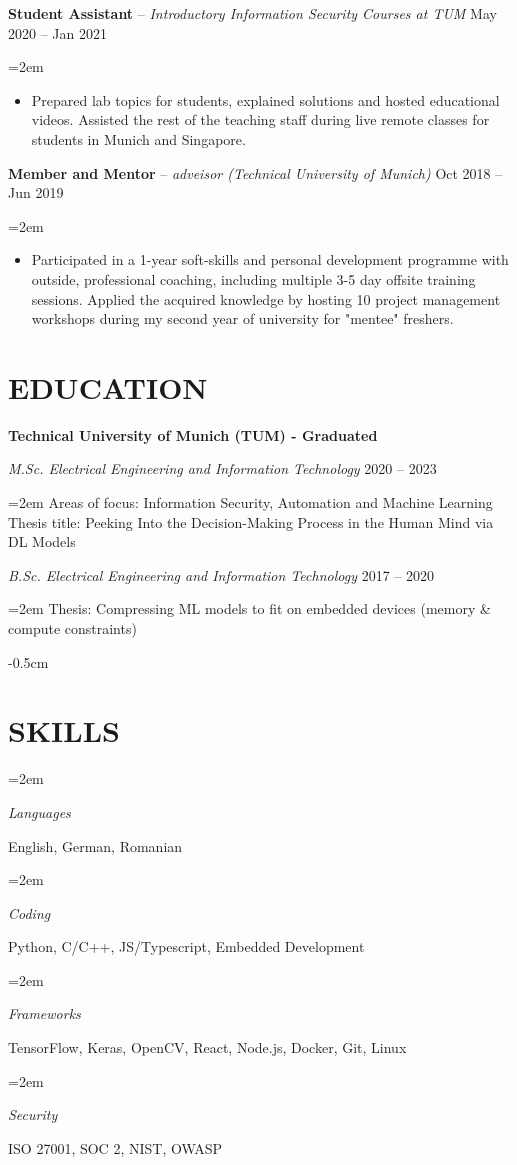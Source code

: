 \documentclass[paper=a4,fontsize=11pt]{scrartcl}
\newlength{\spacebox}
\newcommand{\sepspace}{\vspace*{0.35em}}		%
\newcommand{\NewPart}[1]{\section*{\uppercase{#1}}}
\newcommand{\PersonalEntry}[2]{
		\noindent\hangindent=2em\hangafter=0 %
		\parbox{\spacebox}{        %
		\textit{#1}}		       %
		\hspace{1.5em} #2 \par}    %
\newcommand{\SkillsEntry}[2]{      %
		\noindent\hangindent=2em\hangafter=0 %
		\parbox{\spacebox}{        %
		\textit{#1}}			   %
		\hspace{2.5em} #2 \par}    %
\newcommand{\EducationEntry}[4]{
		\noindent \textit{#1} \hfill      %
		\colorbox{custom_gray}{\color{white}#2} \par  %
		\noindent\hangindent=2em\hangafter=0 \small #3 %
		\normalsize \par}
\newcommand{\WorkEntry}[4]{				  %
		\noindent \textbf{#1} – \textit{#3} \hfill      %
		\colorbox{custom_gray}{\color{white}#2} \par  %
		\noindent\hangindent=2em\hangafter=0 \small #4 %
		\normalsize \par}
\begin{document}
\WorkEntry{Student Assistant}{May 2020 – Jan 2021}{Introductory Information Security Courses at TUM}
{
\begin{itemize}
  \item Prepared lab topics for students, explained solutions and hosted educational videos. Assisted the rest of the teaching staff during live remote classes for students in Munich and Singapore.
\end{itemize}
}

\WorkEntry{Member and Mentor}{Oct 2018 – Jun 2019}{adveisor (Technical University of Munich)}
{
\begin{itemize}
	\item Participated in a 1-year soft-skills and personal development programme with outside, professional coaching, including multiple 3-5 day offsite training sessions. Applied the acquired knowledge by hosting 10 project management workshops during my second year of university for "mentee" freshers.
\end{itemize}
}


\vspace{-0.5cm}
\NewPart{Education}{}
\vspace{-0.3cm}
\textbf{Technical University of Munich (TUM) - Graduated}

\EducationEntry{M.Sc. Electrical Engineering and Information Technology}{2020 – 2023}{Areas of focus: Information Security, Automation and Machine Learning \\
Thesis title: Peeking Into the Decision-Making Process in the Human Mind via DL Models}
\sepspace

\EducationEntry{B.Sc. Electrical Engineering and Information Technology}{2017 – 2020} {Thesis: Compressing ML models to fit on embedded devices (memory \& compute constraints)}


\vspace{-0.5cm}
\NewPart{Skills}{}

\SkillsEntry{Languages}{English, German, Romanian}
\SkillsEntry{Coding}{Python, \textsc{C/C++}, JS/Typescript, Embedded Development}
\SkillsEntry{Frameworks}{TensorFlow, Keras, OpenCV, React, Node.js, Docker, Git, Linux}
\SkillsEntry{Security}{ISO 27001, SOC 2, NIST, OWASP}


\end{document}
